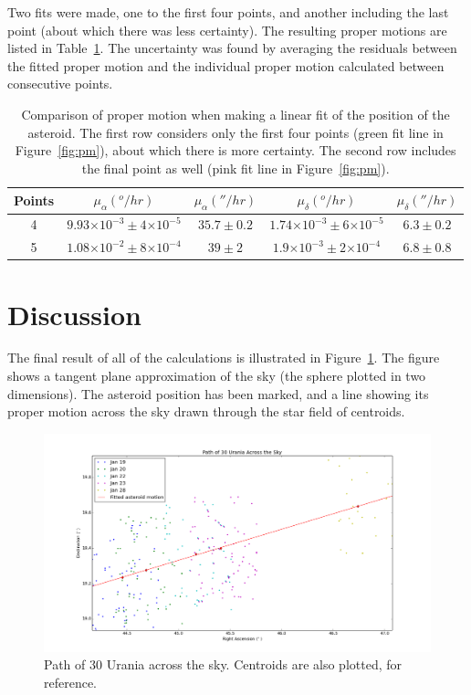 \documentclass[a4paper,12pt]{article}
\providecommand{\e}[1]{\ensuremath{\times 10^{#1}}}
\begin{document}
Two fits were made, one to the first four points, and another including the last point (about which there was less certainty). The resulting proper motions are listed in Table~\ref{tab:pm}. The uncertainty was found by averaging the residuals between the fitted proper motion and the individual proper motion calculated between consecutive points.

\begin{center}
\begin{table}[!htbp]
  \centering
  \begin{tabular}{c||c||c||c||c}
  	Points & $\mu_{\alpha} (^o/hr)$ & $\mu_{\alpha} (''/hr)$ & $\mu_{\delta} (^o/hr)$ & $\mu_{\delta} (''/hr)$ \\
  	\hline
  	4 & $9.93\e{-3}\pm 4\e{-5}$ & $35.7\pm 0.2$ & $1.74\e{-3}\pm 6\e{-5}$& $6.3\pm 0.2$ \\
  	5 & $1.08\e{-2}\pm 8\e{-4}$ & $39\pm 2$ & $1.9\e{-3}\pm 2\e{-4}$ & $6.8\pm 0.8$ \\
   \end{tabular}
    \caption{Comparison of proper motion when making a linear fit of the position of the asteroid. The first row considers only the first four points (green fit line in Figure~\ref{fig:pm}), about which there is more certainty. The second row includes the final point as well (pink fit line in Figure~\ref{fig:pm}).}
    \label{tab:pm}
\end{table}
\end{center}




\section{Discussion}
\label{sec:discussion}

The final result of all of the calculations is illustrated in Figure~\ref{fig:path}. The figure shows a tangent plane approximation of the sky (the sphere plotted in two dimensions). The asteroid position has been marked, and a line showing its proper motion across the sky drawn through the star field of centroids.

\begin{figure}[!htbp]
\centering
\includegraphics[width = \linewidth]{path_urania.png}
\caption{Path of 30 Urania across the sky. Centroids are also plotted, for reference.}
\label{fig:path}
\end{figure}
\end{document}
